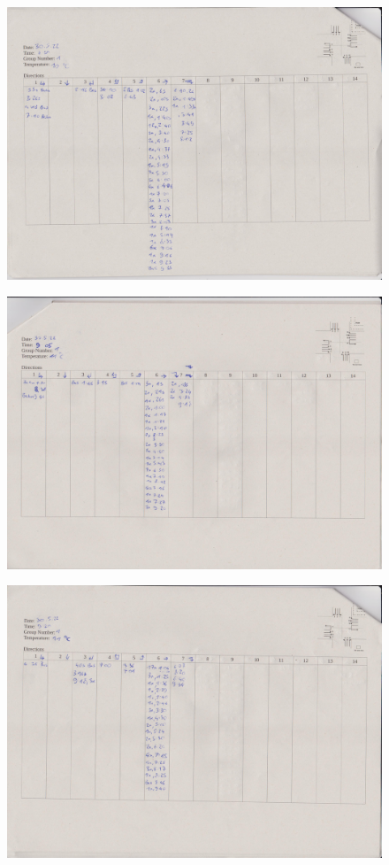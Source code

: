 \begin{figure}[htbp]
  \includegraphics[width=\linewidth]{scans/Bild (4).jpg}
\end{figure}

\begin{figure}[htbp]
  \includegraphics[width=\linewidth]{scans/Bild (5).jpg}
\end{figure}

\begin{figure}[htbp]
  \includegraphics[width=\linewidth]{scans/Bild (6).jpg}
\end{figure}

